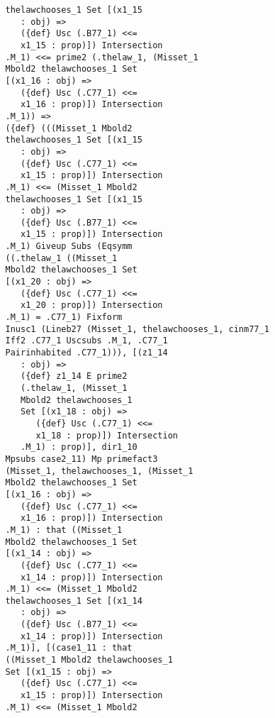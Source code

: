 \documentclass[12pt]{article}
\begin{document}
\begin{verbatim}
                thelawchooses_1 Set [(x1_15 
                   : obj) => 
                   ({def} Usc (.B77_1) <<= 
                   x1_15 : prop)]) Intersection 
                .M_1) <<= prime2 (.thelaw_1, (Misset_1 
                Mbold2 thelawchooses_1 Set 
                [(x1_16 : obj) => 
                   ({def} Usc (.C77_1) <<= 
                   x1_16 : prop)]) Intersection 
                .M_1)) => 
                ({def} (((Misset_1 Mbold2 
                thelawchooses_1 Set [(x1_15 
                   : obj) => 
                   ({def} Usc (.C77_1) <<= 
                   x1_15 : prop)]) Intersection 
                .M_1) <<= (Misset_1 Mbold2 
                thelawchooses_1 Set [(x1_15 
                   : obj) => 
                   ({def} Usc (.B77_1) <<= 
                   x1_15 : prop)]) Intersection 
                .M_1) Giveup Subs (Eqsymm 
                ((.thelaw_1 ((Misset_1 
                Mbold2 thelawchooses_1 Set 
                [(x1_20 : obj) => 
                   ({def} Usc (.C77_1) <<= 
                   x1_20 : prop)]) Intersection 
                .M_1) = .C77_1) Fixform 
                Inusc1 (Lineb27 (Misset_1, thelawchooses_1, cinm77_1 
                Iff2 .C77_1 Uscsubs .M_1, .C77_1 
                Pairinhabited .C77_1))), [(z1_14 
                   : obj) => 
                   ({def} z1_14 E prime2 
                   (.thelaw_1, (Misset_1 
                   Mbold2 thelawchooses_1 
                   Set [(x1_18 : obj) => 
                      ({def} Usc (.C77_1) <<= 
                      x1_18 : prop)]) Intersection 
                   .M_1) : prop)], dir1_10 
                Mpsubs case2_11) Mp primefact3 
                (Misset_1, thelawchooses_1, (Misset_1 
                Mbold2 thelawchooses_1 Set 
                [(x1_16 : obj) => 
                   ({def} Usc (.C77_1) <<= 
                   x1_16 : prop)]) Intersection 
                .M_1) : that ((Misset_1 
                Mbold2 thelawchooses_1 Set 
                [(x1_14 : obj) => 
                   ({def} Usc (.C77_1) <<= 
                   x1_14 : prop)]) Intersection 
                .M_1) <<= (Misset_1 Mbold2 
                thelawchooses_1 Set [(x1_14 
                   : obj) => 
                   ({def} Usc (.B77_1) <<= 
                   x1_14 : prop)]) Intersection 
                .M_1)], [(case1_11 : that 
                ((Misset_1 Mbold2 thelawchooses_1 
                Set [(x1_15 : obj) => 
                   ({def} Usc (.C77_1) <<= 
                   x1_15 : prop)]) Intersection 
                .M_1) <<= (Misset_1 Mbold2 

\end{verbatim}
\end{document}
